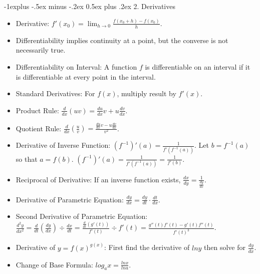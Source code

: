 \documentclass[10pt, portrait]{article}
\makeatletter
\renewcommand{\section}{\@startsection{section}{1}{0mm}%
                                {-1ex plus -.5ex minus -.2ex}%
                                {0.5ex plus .2ex}%
                                {\normalfont\large\bfseries}}
\renewcommand{\section}{\@startsection{section}{2}{0mm}%
                                {-1explus -.5ex minus -.2ex}%
                                {0.5ex plus .2ex}%
                                {\normalfont\normalsize\bfseries}}
\makeatother
\begin{document}
\begin{multicols*}{2}
\section{2. Derivatives}
\begin{itemize}
    \item Derivative: $f'(x_0)=\lim_{h\to 0}\frac{f(x_0+h)-f(x_0)}{h}$.
    \item Differentiability implies continuity at a point, but the converse is not necessarily true.
    \item Differentiability on Interval: A function $f$ is differentiable on an interval if it is differentiable at every point in the interval.
    \item Standard Derivatives: For $f(x)$, multiply result by $f'(x)$.
    \item Product Rule: $\frac{d}{dx}(uv)=\frac{du}{dx}v+u\frac{dv}{dx}$.
    \item Quotient Rule: $\frac{d}{dx}(\frac{u}{v})=\frac{\frac{du}{dx}v-u\frac{dv}{dx}}{v^2}$.
    \item Derivative of Inverse Function: $(f^{-1})'(a)=\frac{1}{f'(f^{-1}(a))}$. Let $b=f^{-1}(a)$ so that $a=f(b)$. $(f^{-1})'(a)=\frac{1}{f'(f^{-1}(a))}=\frac{1}{f'(b)}$.
    \item Reciprocal of Derivative: If an inverse function exists, $\frac{dx}{dy}=\frac{1}{\frac{dy}{dx}}$.
    \item Derivative of Parametric Equation: $\frac{dy}{dx}=\frac{dy}{dt} \cdot \frac{dt}{dx}$.
    \item Second Derivative of Parametric Equation: $\frac{d^2y}{dx^2}=\frac{d}{dt}(\frac{dy}{dx}) \div \frac{dx}{dt}=\frac{\frac{d}{dt}(g'(t))}{f'(t)} \div f'(t)=\frac{g''(t)f'(t)-g'(t)f''(t)}{f'(t)^3}$.
    \item Derivative of $y=f(x)^{g(x)}$: First find the derivative of $lny$ then solve for $\frac{dy}{dx}$.
    \item Change of Base Formula: $log_ax=\frac{lnx}{lna}$.
\end{itemize}


\end{multicols*}
\end{document}
